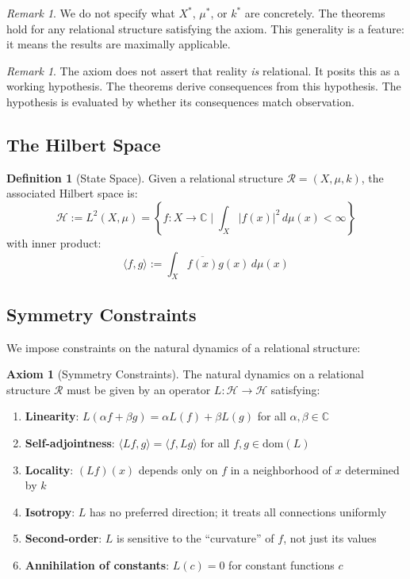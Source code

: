 \documentclass[11pt,a4paper]{article}
\theoremstyle{plain}
\theoremstyle{definition}
\newtheorem{definition}[theorem]{Definition}
\newtheorem{axiom}{Axiom}
\theoremstyle{remark}
\newtheorem{remark}[theorem]{Remark}
\newcommand{\C}{\mathbb{C}}
\newcommand{\Hilbert}{\mathcal{H}}
\newcommand{\ip}[2]{\langle #1, #2 \rangle}
\begin{document}
\begin{remark}
We do not specify what $X^*$, $\mu^*$, or $k^*$ are concretely. The theorems hold for any relational structure satisfying the axiom. This generality is a feature: it means the results are maximally applicable.
\end{remark}

\begin{remark}
The axiom does not assert that reality \emph{is} relational. It posits this as a working hypothesis. The theorems derive consequences from this hypothesis. The hypothesis is evaluated by whether its consequences match observation.
\end{remark}

\subsection{The Hilbert Space}

\begin{definition}[State Space]\label{def:hilbert}
Given a relational structure $\mathcal{R} = (X, \mu, k)$, the associated Hilbert space is:
\[
\Hilbert := L^2(X, \mu) = \left\{ f : X \to \C \;\Big|\; \int_X |f(x)|^2 \, d\mu(x) < \infty \right\}
\]
with inner product:
\[
\ip{f}{g} := \int_X \overline{f(x)} g(x) \, d\mu(x)
\]
\end{definition}

\subsection{Symmetry Constraints}

We impose constraints on the natural dynamics of a relational structure:

\begin{axiom}[Symmetry Constraints]\label{ax:symmetry}
The natural dynamics on a relational structure $\mathcal{R}$ must be given by an operator $L : \Hilbert \to \Hilbert$ satisfying:
\begin{enumerate}[label=(\roman*),noitemsep]
    \item \textbf{Linearity}: $L(\alpha f + \beta g) = \alpha L(f) + \beta L(g)$ for all $\alpha, \beta \in \C$
    \item \textbf{Self-adjointness}: $\ip{Lf}{g} = \ip{f}{Lg}$ for all $f, g \in \text{dom}(L)$
    \item \textbf{Locality}: $(Lf)(x)$ depends only on $f$ in a neighborhood of $x$ determined by $k$
    \item \textbf{Isotropy}: $L$ has no preferred direction; it treats all connections uniformly
    \item \textbf{Second-order}: $L$ is sensitive to the ``curvature'' of $f$, not just its values
    \item \textbf{Annihilation of constants}: $L(c) = 0$ for constant functions $c$
\end{enumerate}
\end{axiom}
\end{document}
